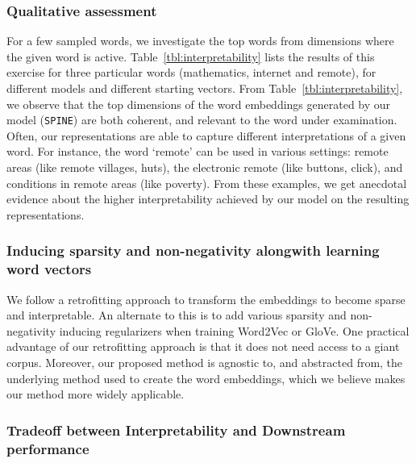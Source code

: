 \documentclass[letterpaper]{article} %
\begin{document}
\subsubsection{Qualitative assessment}
For a few sampled words, we investigate the top words from dimensions where the given word is active. Table~\ref{tbl:interpretability} lists the results of this exercise for three particular words (mathematics, internet and remote), for different models and different starting vectors. From Table~\ref{tbl:interpretability}, we observe that the top dimensions of the word embeddings generated by our model (\texttt{SPINE}) are both coherent, and relevant to the word under examination. Often, our representations are able to capture different interpretations of a given word. For instance, the word `remote' can be used in various settings: remote areas (like remote villages, huts), the electronic remote (like buttons, click), and conditions in remote areas (like poverty). From these examples, we get anecdotal evidence about the higher interpretability achieved by our model on the resulting representations.


\subsubsection{Inducing sparsity and non-negativity alongwith learning word vectors}
We follow a retrofitting approach to transform the embeddings to become sparse and interpretable. An alternate to this is to add various sparsity and non-negativity inducing regularizers  when training Word2Vec or GloVe. One practical advantage of our retrofitting approach is that it does not need access to a giant corpus. Moreover, our proposed method is agnostic to, and abstracted from, the underlying method used to create the word embeddings, which we believe makes our method more widely applicable.

\subsubsection{Tradeoff between Interpretability and Downstream performance}

\end{document}

